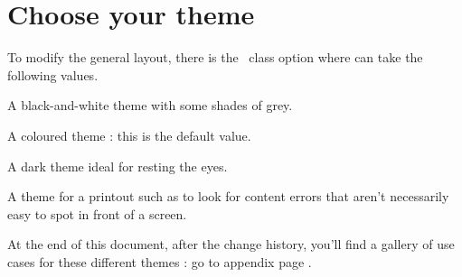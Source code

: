 \documentclass{tutodoc}
\begin{document}
\section{Choose your theme}

To modify the general layout, there is the \thisproj\ class option  where  can take the following values.

\begin{center}
    \begin{minipage}{.925\linewidth}
        \begin{description}[wide]
            \item[bw]
            A black-and-white theme with some shades of grey.
        
            \item[color]
            A coloured theme : this is the default value.
        
            \item[dark]
            A dark theme ideal for resting the eyes.
        
            \item[draft]
            A theme for a printout such as to look for content errors that aren't necessarily easy to spot in front of a screen.
        \end{description}
    \end{minipage}
\end{center}


\begin{tdocnote}
    At the end of this document, after the change history, you'll find a gallery of use cases for these different themes : go to appendix page \pageref{tutodoc-theme-gallery}.
\end{tdocnote}
\end{document}
